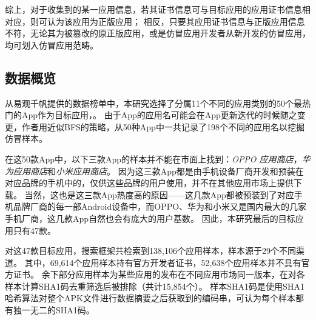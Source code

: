 综上，对于收集到的某一应用信息，若其证书信息可与目标应用的应用证书信息相对应，则可认为该应用为正版应用；
相反，只要其应用证书信息与正版应用信息不符，无论其为被篡改的原正版应用，或是仿冒应用开发者从新开发的仿冒应用，均可划入仿冒应用范畴。


\subsection{数据概览}
\label{sec:data_overview}


从易观千帆提供的数据榜单中，本研究选择了分属11个不同的应用类别的50个最热门的App作为目标应用，。
由于App的应用名可能会在App更新迭代的时候随之变更，作者用近似BFS的策略，从50种App中一共记录了198个不同的应用名以挖掘仿冒样本。

在这50款App中，以下三款App的样本并不能在市面上找到：\emph{OPPO 应用商店}，\emph{华为应用商店}和\emph{小米应用商店}。
因为这三款App都是由手机设备厂商开发和预装在对应品牌的手机中的，仅供这些品牌的用户使用，并不在其他应用市场上提供下载。
当然，这也是这三款App热度高的原因——这几款App都被预装到了对应手机品牌厂商的每一部Android设备中，而OPPO、华为和小米又是国内最大的几家手机厂商，这几款App自然也会有庞大的用户基数。
因此，本研究最后的目标应用只有47款。

对这47款目标应用，搜索框架共检索到138,106个应用样本，样本源于29个不同渠道。
其中，69,614个应用样本持有官方开发者证书，52,638个应用样本并不具有官方证书。
余下部分应用样本为某些应用的发布在不同应用市场同一版本，在对各样本计算SHA1码去重筛选后被排除（共计15,854个）。
样本SHA1码是使用SHA1哈希算法对整个APK文件进行数据摘要之后获取到的编码串，可认为每个样本都有独一无二的SHA1码。




